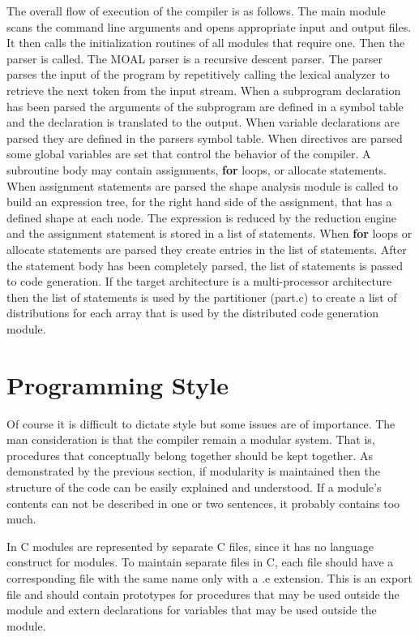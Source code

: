 The overall flow of execution of the compiler is as follows.  The main module
scans the command line arguments and opens appropriate input and output files.
It then calls the initialization routines of all modules that require one.  
Then the parser is called.  The MOAL parser is a recursive descent parser.  The
parser parses the input of the program by repetitively calling the lexical
analyzer to retrieve the next token from the input stream.  When a subprogram
declaration has been parsed the arguments of the subprogram are defined in
a symbol table and the declaration is translated to the output.  When variable
declarations are parsed they are defined in the parsers symbol table.
When directives are parsed some global variables are set that control the
behavior of the compiler.  A subroutine body may contain assignments, {\bf for}
loops, or allocate statements.  When assignment statements are parsed the 
shape analysis module is called to build an expression tree, for the right
hand side of the assignment, that has a defined shape at each node.  The 
expression is reduced by the reduction engine and the 
assignment statement is stored in a list of statements.  When {\bf for} loops 
or allocate statements are parsed they create entries in the list of 
statements.
After the statement body has been completely parsed, the list of statements
is passed to code generation.  If the target architecture is a multi-processor
architecture then the list of statements is used by the partitioner (part.c) 
to create a list of distributions for each array that is used by the 
distributed code generation module.

\section{Programming Style}
  Of course it is difficult to dictate style but some issues are of 
importance.  The man consideration is that the compiler remain a modular
system.  That is, procedures that conceptually belong together should be
kept together.  As demonstrated by the previous section, if modularity
is maintained then the structure of the code can be easily explained and
understood.  If a module's contents can not be described in one or two 
sentences, it probably contains too much.  

In C modules are represented by
separate C files, since it has no language construct for modules.  To maintain
separate files in C, each file should have a corresponding file with the
same name only with a .e extension.  This is an export file and should contain
prototypes for procedures that may be used outside the module and extern 
declarations for variables that may be used outside the module.


